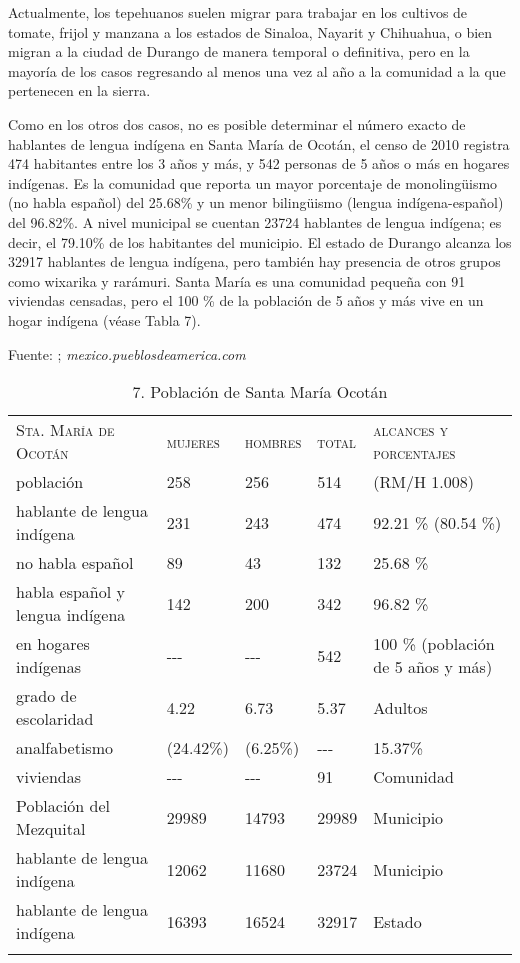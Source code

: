 \documentclass[output=paper]{../langscibook}
\begin{document}
Actualmente, los tepehuanos suelen migrar para trabajar en los cultivos de tomate, frijol y manzana a los estados de Sinaloa, Nayarit y Chihuahua, o bien migran a la ciudad de Durango de manera temporal o definitiva, pero en la mayoría de los casos regresando al menos una vez al año a la comunidad a la que pertenecen en la sierra.

Como en los otros dos casos, no es posible determinar el número exacto de hablantes de lengua indígena en Santa María de Ocotán, el censo de 2010 registra 474 habitantes entre los 3 años y más, y 542 personas de 5 años o más en hogares indígenas. Es la comunidad que reporta un mayor porcentaje de monolingüismo (no habla español) del 25.68\% y un menor bilingüismo (lengua indígena-español) del 96.82\%. A nivel municipal se cuentan 23724 hablantes de lengua indígena; es decir, el 79.10\% de los habitantes del municipio. El estado de Durango alcanza los 32917 hablantes de lengua indígena, pero también hay presencia de otros grupos como wixarika y rarámuri. Santa María es una comunidad pequeña con 91 viviendas censadas, pero el 100 \% de la población de 5 años y más vive en un hogar indígena (véase Tabla 7).

\begin{table}
\caption{\label{tab:guerrero}7. Población de Santa María Ocotán }
Fuente: \citet{INEGI2010}; \textit{mexico.pueblosdeamerica.com}
\begin{tabularx}{\textwidth}{XXXXX}
\lsptoprule
{\textsc{Sta.} \textsc{María} \textsc{de} \textsc{Ocotán}} & {\textsc{mujeres}} & {\textsc{hombres}} & {\textsc{total}} & {\textsc{alcances} \textsc{y} \textsc{porcentajes}}\\
{población} & {258} & {256} & {514} & {(RM/H 1.008)}\\
{hablante de lengua indígena} & {231} & {243} & {474} & {92.21 \% (80.54 \%)}\\
{no habla español} & {89} & {43} & {132} & {25.68 \%}\\
{habla español y lengua indígena} & {142} & {200} & {342} & {96.82 \%}\\
{en hogares indígenas} & {{}-{}-{}-} & {{}-{}-{}-} & {542}  & {100 \% (población de 5 años y más)}\\
{grado de escolaridad} & {4.22} & {6.73} & {5.37}  & {Adultos}\\
{analfabetismo} & {(24.42\%)} & {(6.25\%)} & {{}-{}-{}-} & {15.37\%}\\
{viviendas} & {{}-{}-{}-} & {{}-{}-{}-} & {91} & {Comunidad}\\
{Población del Mezquital} & {29989} & {14793} & {29989} & {Municipio}\\
{hablante de lengua indígena} & {12062} & {11680} & {23724} & {Municipio}\\
{hablante de lengua indígena} & {16393} & {16524} & {32917} & {Estado}\\
\lspbottomrule
\end{tabularx}
\end{table}
\end{document}

